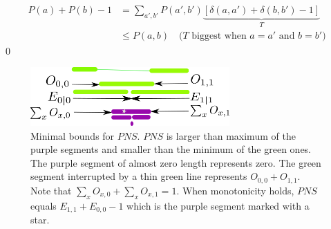 \begin{align}
P(a) + P(b) -1
&=
\sum_{a', b'} P(a',b')
\underbrace
{[\delta(a,a')+\delta(b,b')
-1]}_{T}
\\
&\leq
P(a,b)\quad 
\text{($T$ biggest
when $a=a'$ and $b=b'$)}
\end{align}
\qed


\begin{figure}[h!]
\centering
\includegraphics[width=3in]
{personalized/bounds-minimal.png}
\caption{Minimal bounds
for $PNS$.
$PNS$ is larger
than maximum of the purple segments
and smaller than the
minimum of the green ones.
The purple segment of almost zero
length represents zero.
The green segment 
interrupted by a thin green
line represents $O_{0,0} + O_{1,1}$.
Note that $\sum_x O_{x,0}+ 
\sum_x O_{x,1}=1$. When
monotonicity holds,
$PNS$ equals $E_{1,1}+E_{0,0}-1$
which is the purple
segment marked with a star.
} 
\label{fig-bounds-minimal}
\end{figure}

